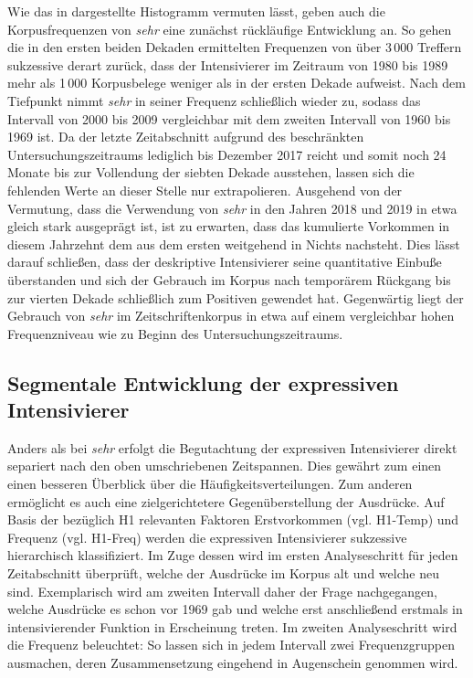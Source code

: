\noindent Wie das in  dargestellte Histogramm vermuten lässt, geben auch die Korpusfrequenzen von \textit{sehr} eine zunächst rückläufige Entwicklung an. So gehen die in den ersten beiden Dekaden ermittelten Frequenzen von über 3\,000 Treffern sukzessive derart zurück, dass der Intensivierer im Zeitraum von 1980 bis 1989 mehr als 1\,000 Korpusbelege weniger als in der ersten Dekade aufweist. Nach dem Tiefpunkt nimmt \textit{sehr} in seiner Frequenz schließlich wieder zu, sodass das Intervall von 2000 bis 2009 vergleichbar mit dem zweiten Intervall von 1960 bis 1969 ist. Da der letzte Zeitabschnitt aufgrund des beschränkten Untersuchungszeitraums lediglich bis Dezember 2017 reicht und somit noch 24 Monate bis zur Vollendung der siebten Dekade ausstehen, lassen sich die fehlenden Werte an dieser Stelle nur extrapolieren. Ausgehend von der Vermutung, dass die Verwendung von \textit{sehr} in den Jahren 2018 und 2019 in etwa gleich stark ausgeprägt ist, ist zu erwarten, dass das kumulierte Vorkommen in diesem Jahrzehnt dem aus dem ersten weitgehend in Nichts nachsteht. Dies lässt darauf schließen, dass der deskriptive Intensivierer seine quantitative Einbuße überstanden und sich der Gebrauch im Korpus nach temporärem Rückgang bis zur vierten Dekade schließlich zum Positiven gewendet hat. Gegenwärtig liegt der Gebrauch von \textit{sehr} im Zeitschriftenkorpus in etwa auf einem vergleichbar hohen Frequenzniveau wie zu Beginn des Untersuchungszeitraums.

\subsection{Segmentale Entwicklung der expressiven Intensivierer}
Anders als bei \textit{sehr} erfolgt die Begutachtung der expressiven Intensivierer direkt separiert nach den oben umschriebenen Zeitspannen. Dies gewährt zum einen einen besseren Überblick über die Häufigkeitsverteilungen. Zum anderen ermöglicht es auch eine zielgerichtetere Gegenüberstellung der Ausdrücke. Auf Basis der bezüglich H1 relevanten Faktoren Erstvorkommen (vgl. H1-Temp) und Frequenz (vgl. H1-Freq) werden die expressiven Intensivierer sukzessive hierarchisch klassifiziert. Im Zuge dessen wird im ersten Analyseschritt für jeden Zeitabschnitt überprüft, welche der Ausdrücke im Korpus alt und welche neu sind. Exemplarisch wird am zweiten Intervall daher der Frage nachgegangen, welche Ausdrücke es schon vor 1969 gab und welche erst anschließend erstmals in intensivierender Funktion in Erscheinung treten. Im zweiten Analyseschritt wird die Frequenz beleuchtet: So lassen sich in jedem Intervall zwei Frequenzgruppen ausmachen, deren Zusammensetzung eingehend in Augenschein genommen wird.

